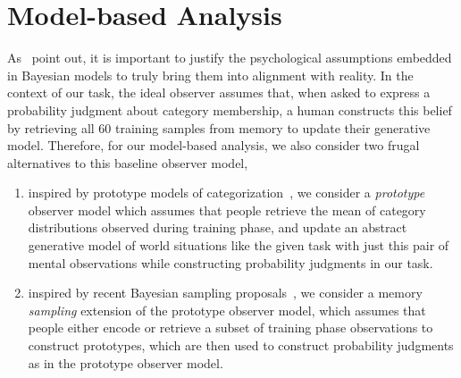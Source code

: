 \documentclass[10pt,letterpaper]{article}
\begin{document}



\section{Model-based Analysis}

As~ point out, it is important to justify the psychological assumptions embedded in Bayesian models to truly bring them into alignment with reality. In the context of our task, the ideal observer assumes that, when asked to express a probability judgment about category membership, a human constructs this belief by retrieving all 60 training samples from memory to update their generative model. Therefore, for our model-based analysis, we also consider two frugal alternatives to this baseline observer model,
\begin{enumerate}
    \item inspired by prototype models of categorization~\cite{fried1984induction, minda2001prototypes}, we consider a {\em prototype} observer model which assumes that people retrieve the mean of category distributions observed during training phase, and update an abstract generative model of world situations like the given task with just this pair of mental observations while constructing probability judgments in our task. 
    \item inspired by recent Bayesian sampling proposals~\cite{sanborn2016bayesian, zhu2020bayesian}, we consider a memory {\em sampling} extension of the prototype observer model, which assumes that people either encode or retrieve a subset of training phase observations to construct prototypes, which are then used to construct probability judgments as in the prototype observer model. 
\end{enumerate}
\end{document}
